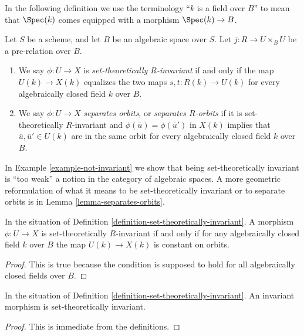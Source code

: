\noindent
In the following definition we use the terminology ``$k$ is a field
over $B$'' to mean that $\Spec(k)$ comes equipped with a morphism
$\Spec(k) \to B$.

\begin{definition}
\label{definition-set-theoretically-invariant}
Let $S$ be a scheme, and let $B$ be an algebraic space over $S$.
Let $j : R \to U \times_B U$ be a pre-relation over $B$.
\begin{enumerate}
\item We say $\phi : U \to X$ is {\it set-theoretically $R$-invariant}
if and only if the map $U(k) \to X(k)$ equalizes the two maps
$s, t : R(k) \to U(k)$ for every algebraically closed field $k$
over $B$.
\item We say $\phi : U \to X$ {\it separates orbits}, or
{\it separates $R$-orbits} if it is set-theoretically $R$-invariant and
$\phi(\overline{u}) = \phi(\overline{u}')$ in $X(k)$ implies that
$\overline{u}, \overline{u}' \in U(k)$ are in the same orbit
for every algebraically closed field $k$ over $B$.
\end{enumerate}
\end{definition}

\noindent
In
Example \ref{example-not-invariant}
we show that being set-theoretically invariant is ``too weak'' a notion in
the category of algebraic spaces. A more geometric reformulation
of what it means to be set-theoretically invariant or to separate orbits is in
Lemma \ref{lemma-separates-orbits}.

\begin{lemma}
\label{lemma-set-theoretic-invariant}
In the situation of Definition \ref{definition-set-theoretically-invariant}.
A morphism $\phi : U \to X$ is set-theoretically $R$-invariant if and
only if for any algebraically closed field $k$ over $B$ the map
$U(k) \to X(k)$ is constant on orbits.
\end{lemma}

\begin{proof}
This is true because the condition is supposed to hold for all algebraically
closed fields over $B$.
\end{proof}

\begin{lemma}
\label{lemma-invariant-set-theoretically-invariant}
In the situation of Definition \ref{definition-set-theoretically-invariant}.
An invariant morphism is set-theoretically invariant.
\end{lemma}

\begin{proof}
This is immediate from the definitions.
\end{proof}

